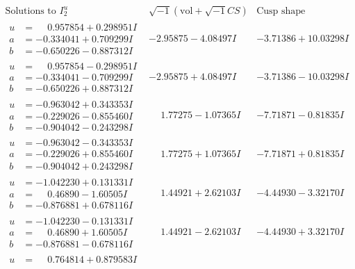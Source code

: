 \documentclass[1p]{elsarticle_modified}
\theoremstyle{definition}
\newcommand{\I}{\sqrt{-1}}
\begin{document}
$$\begin{array}{c|c|c}  
\text{Solutions to }I^u_{2}& \I (\text{vol} + \sqrt{-1}CS) & \text{Cusp shape}\\
 \hline 
\begin{aligned}
u &= \phantom{-}0.957854 + 0.298951 I \\
a &= -0.334041 + 0.709299 I \\
b &= -0.650226 - 0.887312 I\end{aligned}
 & -2.95875 - 4.08497 I & -3.71386 + 10.03298 I \\ \hline\begin{aligned}
u &= \phantom{-}0.957854 - 0.298951 I \\
a &= -0.334041 - 0.709299 I \\
b &= -0.650226 + 0.887312 I\end{aligned}
 & -2.95875 + 4.08497 I & -3.71386 - 10.03298 I \\ \hline\begin{aligned}
u &= -0.963042 + 0.343353 I \\
a &= -0.229026 - 0.855460 I \\
b &= -0.904042 - 0.243298 I\end{aligned}
 & \phantom{-}1.77275 - 1.07365 I & -7.71871 - 0.81835 I \\ \hline\begin{aligned}
u &= -0.963042 - 0.343353 I \\
a &= -0.229026 + 0.855460 I \\
b &= -0.904042 + 0.243298 I\end{aligned}
 & \phantom{-}1.77275 + 1.07365 I & -7.71871 + 0.81835 I \\ \hline\begin{aligned}
u &= -1.042230 + 0.131331 I \\
a &= \phantom{-}0.46890 - 1.60505 I \\
b &= -0.876881 + 0.678116 I\end{aligned}
 & \phantom{-}1.44921 + 2.62103 I & -4.44930 - 3.32170 I \\ \hline\begin{aligned}
u &= -1.042230 - 0.131331 I \\
a &= \phantom{-}0.46890 + 1.60505 I \\
b &= -0.876881 - 0.678116 I\end{aligned}
 & \phantom{-}1.44921 - 2.62103 I & -4.44930 + 3.32170 I \\ \hline\begin{aligned}
u &= \phantom{-}0.764814 + 0.879583 I \\

\end{aligned}
\end{array}$$
\end{document}
